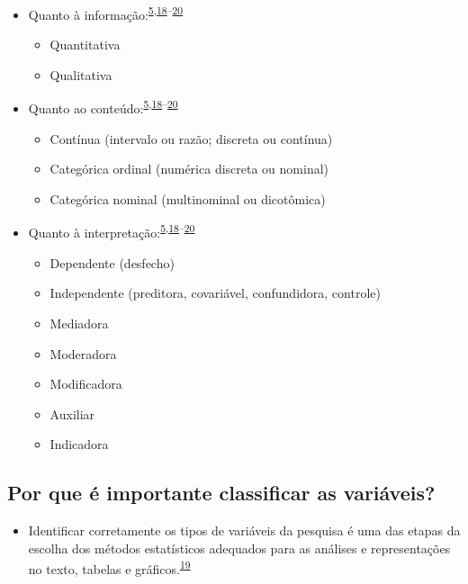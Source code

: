 \documentclass[
]{book}
\providecommand{\tightlist}{%
  \setlength{\itemsep}{0pt}\setlength{\parskip}{0pt}}
\begin{document}
\begin{itemize}
\item
  Quanto à informação:\textsuperscript{\protect\hyperlink{ref-vetter2017}{5},\protect\hyperlink{ref-Ali2016}{18}--\protect\hyperlink{ref-kaliyadan2019}{20}}

  \begin{itemize}
  \item
    Quantitativa
  \item
    Qualitativa
  \end{itemize}
\item
  Quanto ao conteúdo:\textsuperscript{\protect\hyperlink{ref-vetter2017}{5},\protect\hyperlink{ref-Ali2016}{18}--\protect\hyperlink{ref-kaliyadan2019}{20}}

  \begin{itemize}
  \item
    Contínua (intervalo ou razão; discreta ou contínua)
  \item
    Categórica ordinal (numérica discreta ou nominal)
  \item
    Categórica nominal (multinominal ou dicotômica)
  \end{itemize}
\item
  Quanto à interpretação:\textsuperscript{\protect\hyperlink{ref-vetter2017}{5},\protect\hyperlink{ref-Ali2016}{18}--\protect\hyperlink{ref-kaliyadan2019}{20}}

  \begin{itemize}
  \item
    Dependente (desfecho)
  \item
    Independente (preditora, covariável, confundidora, controle)
  \item
    Mediadora
  \item
    Moderadora
  \item
    Modificadora
  \item
    Auxiliar
  \item
    Indicadora
  \end{itemize}
\end{itemize}

\hypertarget{por-que-uxe9-importante-classificar-as-variuxe1veis}{%
\subsection{Por que é importante classificar as variáveis?}\label{por-que-uxe9-importante-classificar-as-variuxe1veis}}

\begin{itemize}
\tightlist
\item
  Identificar corretamente os tipos de variáveis da pesquisa é uma das etapas da escolha dos métodos estatísticos adequados para as análises e representações no texto, tabelas e gráficos.\textsuperscript{\protect\hyperlink{ref-Dettori2018}{19}}
\end{itemize}
\end{document}

